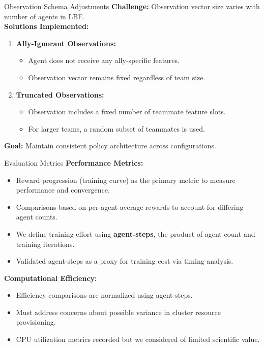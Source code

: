 \begin{frame}{Observation Schema Adjustments}
    \textbf{Challenge:} Observation vector size varies with number of agents in LBF.\\[1em]
    \textbf{Solutions Implemented:}
    \begin{enumerate}
        \item \textbf{Ally-Ignorant Observations:}
            \begin{itemize}
                \item Agent does not receive any ally-specific features.
                \item Observation vector remains fixed regardless of team size.
            \end{itemize}
        \item \textbf{Truncated Observations:}
            \begin{itemize}
                \item Observation includes a fixed number of teammate feature slots.
                \item For larger teams, a random subset of teammates is used.
            \end{itemize}
    \end{enumerate}
    \textbf{Goal:} Maintain consistent policy architecture across configurations.
\end{frame}


\begin{frame}{Evaluation Metrics}
    \textbf{Performance Metrics:}
    \begin{itemize}
        \item Reward progression (training curve) as the primary metric to measure performance and convergence.
        \item Comparisons based on per-agent average rewards to account for differing agent counts.
        \item We define training effort using \textbf{agent-steps}, the product of agent count and training iterations.
        \item Validated agent-steps as a proxy for training cost via timing analysis.
    \end{itemize}

    \textbf{Computational Efficiency:}
    \begin{itemize}
        \item Efficiency comparisons are normalized using agent-steps.
        \item Must address concerns about possible variance in cluster resource provisioning.
        \item CPU utilization metrics recorded but we considered of limited scientific value.
    \end{itemize}
\end{frame}


